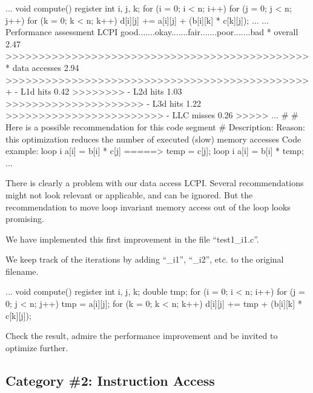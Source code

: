 \begin{prompt}
...
void compute()
{
register int i, j, k;
for (i = 0; i < n; i++)
  for (j = 0; j < n; j++)
    for (k = 0; k < n; k++)
      d[i][j] += a[i][j] + (b[i][k] * c[k][j]);
}
...
...
Performance assessment  LCPI good.......okay.......fair.......poor.......bad
* overall              2.47 >>>>>>>>>>>>>>>>>>>>>>>>>>>>>>>>>>>>>>>>>>>>>>
* data accesses        2.94 >>>>>>>>>>>>>>>>>>>>>>>>>>>>>>>>>>>>>>>>>>>>>>+
- L1d hits             0.42 >>>>>>>>
- L2d hits             1.03 >>>>>>>>>>>>>>>>>>>>>
- L3d hits             1.22 >>>>>>>>>>>>>>>>>>>>>>>>
- LLC misses           0.26 >>>>>
...
\#
\# Here is a possible recommendation for this code segment
\#
Description: %
Reason: this optimization reduces the number of executed (slow) memory accesses
Code example:
loop i {
  a[i] = b[i] * c[j]
}
=====>
temp = c[j];
loop i {
 a[i] = b[i] * temp;
}
...
\end{prompt}

There is clearly a problem with our data access LCPI. Several recommendations might not look relevant or applicable, and can be ignored. But the recommendation to move loop invariant memory access out of the loop looks promising.

We have implemented this first improvement in the file ``test1\_i1.c''.

 We keep track of the iterations by adding ``\_i1'', ``\_i2'', etc. to the original filename.

\begin{prompt}
...
void compute()
{
register int i, j, k;
double tmp;
for (i = 0; i < n; i++)
  for (j = 0; j < n; j++)
  {
    tmp = a[i][j];
    for (k = 0; k < n; k++)
      d[i][j] += tmp + (b[i][k] * c[k][j]);
  }
}
\end{prompt}

Check the result, admire the performance improvement and be invited to optimize further.

\subsection{Category \#2: Instruction Access}
\label{subsec:CAT2_Instruction_Access}

